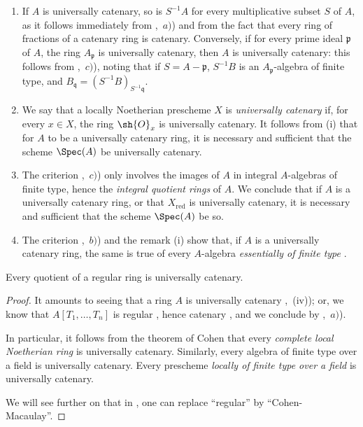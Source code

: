 \begin{remarks}[5.6.3]
\label{IV.5.6.3}
\begin{enumerate}[label=(\roman*)]
  \item If $A$ is universally catenary, so is $S^{-1}A$ for every multiplicative subset $S$ of $A$, as it follows immediately from ,~$a)$) and from the fact that every ring of fractions of a catenary ring is catenary.
Conversely, if for every prime ideal $\mathfrak{p}$ of $A$, the ring $A_\mathfrak{p}$ is universally catenary, then $A$ is universally catenary: this follows from ,~$c)$), noting that if $S=A-\mathfrak{p}$, $S^{-1}B$ is an $A_\mathfrak{p}$-algebra of finite type, and $B_\mathfrak{q}=(S^{-1}B)_{S^{-1}\mathfrak{q}}$.
  \item We say that a locally Noetherian prescheme $X$ is \emph{universally catenary} if, for every $x\in X$, the ring $\sh{O}_x$ is universally catenary.
It follows from (i) that for $A$ to be a universally catenary ring, it is necessary and sufficient that the scheme $\Spec(A)$ be universally catenary.
  \item The criterion ,~$c)$) only involves the images of $A$ in integral $A$-algebras of finite type, hence the \emph{integral quotient rings} of $A$.
We conclude that if $A$ is a universally catenary ring, or that $X_{\mathrm{red}}$ is universally catenary, it is necessary and sufficient that the scheme $\Spec(A)$ be so.
  \item The criterion ,~$b)$) and the remark (i) show that, if $A$ is a universally catenary ring, the same is true of every $A$-algebra \emph{essentially of finite type} .
\end{enumerate}
\end{remarks}

\begin{proposition}[5.6.4]
\label{IV.5.6.4}
Every quotient of a regular ring is universally catenary.
\end{proposition}

\begin{proof}
It amounts to seeing that a ring $A$ is universally catenary ,~(iv)); or, we know that $A[T_1,\ldots,T_n]$ is regular , hence catenary , and we conclude by ,~$a)$).

In particular, it follows from the theorem of Cohen  that every \emph{complete local Noetherian ring} is universally catenary.
Similarly, every algebra of finite type over a field is universally catenary.
Every prescheme \emph{locally of finite type over a field} is universally catenary.

We will see further on  that in , one can replace ``regular'' by ``Cohen-Macaulay''.
\end{proof}

